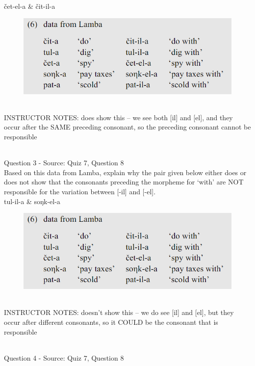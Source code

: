 \documentclass[12pt]{article}
\begin{document}
čet-el-a \& čit-il-a

\begin{figure}[H]
\includegraphics{../images/peng119_lamba.png}
\end{figure}

~\\
INSTRUCTOR NOTES: does show this -- we see both [il] and [el], and they occur after the SAME preceding consonant, so the preceding consonant cannot be responsible


~\\

{\large Question 3} - Source: Quiz 7, Question 8\\

Based on this data from Lamba, explain why the pair given below either does or does not show that the consonants preceding the morpheme for `with' are NOT responsible for the variation between [-il] and [-el].\\

tul-il-a \& soŋk-el-a

\begin{figure}[H]
\includegraphics{../images/peng119_lamba.png}
\end{figure}

~\\
INSTRUCTOR NOTES: doesn't show this -- we do see [il] and [el], but they occur after different consonants, so it COULD be the consonant that is responsible


~\\

{\large Question 4} - Source: Quiz 7, Question 8\\
\end{document}

